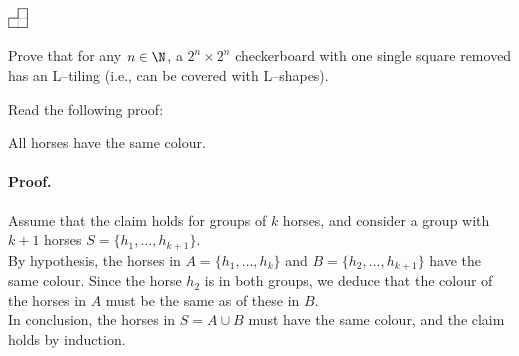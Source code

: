 \begin{exercises}
\begin{problist}
		\begin{center}
			\includegraphics*[width=15pt]{images/app-ind-L-shape.pdf}
		\end{center}
		\prob Prove that for any $n \in \N$, a $2^n \times 2^n$ checkerboard with one single square removed has an L--tiling (i.e., can be covered with L--shapes).
%
%
%
%
%

		\prob Read the following proof:
		
		\begin{theorem} All horses have the same colour.
		\end{theorem}
		
		\begin{graybox}
			
		\paragraph{Proof.}
		Assume that the claim holds for groups of $k$ horses, and consider a group with $k+1$ horses $S = \{h_1, \ldots, h_{k+1}\}$.\\
		
		By hypothesis, the horses in $A = \{h_1,\ldots, h_k\}$ and $B = \{h_2, \ldots, h_{k+1}\}$ have the same colour. Since the horse $h_2$ is in both groups, we deduce that the colour of the horses in $A$ must be the same as of these in $B$.  \\
		
		In conclusion, the horses in $S = A \cup B$ must have the same colour, and the claim holds by induction.	
		\end{graybox}
		

\end{problist}
\end{exercises}
